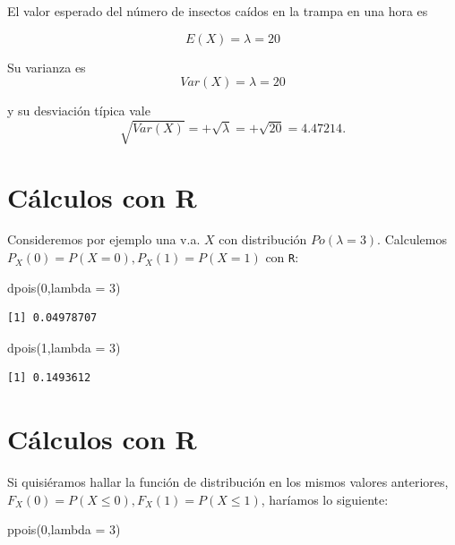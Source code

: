\documentclass[
  letterpaper,
  DIV=11,
  numbers=noendperiod]{scrreprt}
\newenvironment{Shaded}{\begin{snugshade}}{\end{snugshade}}
\newcommand{\AttributeTok}[1]{\textcolor[rgb]{0.40,0.45,0.13}{#1}}
\newcommand{\DecValTok}[1]{\textcolor[rgb]{0.68,0.00,0.00}{#1}}
\newcommand{\FunctionTok}[1]{\textcolor[rgb]{0.28,0.35,0.67}{#1}}
\newcommand{\NormalTok}[1]{\textcolor[rgb]{0.00,0.23,0.31}{#1}}
\begin{document}
El valor esperado del número de insectos caídos en la trampa en una hora
es

\[E(X)=\lambda=20\]

Su varianza es \[Var(X)=\lambda=20\]

y su desviación típica vale
\[\sqrt{Var(X)}=+\sqrt{\lambda}=+\sqrt{20}=4.47214.\]

\section{Cálculos con R}\label{cuxe1lculos-con-r-4}

Consideremos por ejemplo una v.a. \(X\) con distribución
\(Po(\lambda=3)\). Calculemos \(P_X(0)=P(X=0), P_X(1)=P(X=1)\) con
\texttt{R}:

\begin{Shaded}
\begin{Highlighting}[]
\FunctionTok{dpois}\NormalTok{(}\DecValTok{0}\NormalTok{,}\AttributeTok{lambda =} \DecValTok{3}\NormalTok{)}
\end{Highlighting}
\end{Shaded}

\begin{verbatim}
[1] 0.04978707
\end{verbatim}

\begin{Shaded}
\begin{Highlighting}[]
\FunctionTok{dpois}\NormalTok{(}\DecValTok{1}\NormalTok{,}\AttributeTok{lambda =} \DecValTok{3}\NormalTok{)}
\end{Highlighting}
\end{Shaded}

\begin{verbatim}
[1] 0.1493612
\end{verbatim}

\section{Cálculos con R}\label{cuxe1lculos-con-r-5}

Si quisiéramos hallar la función de distribución en los mismos valores
anteriores, \(F_X(0)=P(X\leq 0), F_X(1)=P(X\leq 1)\), haríamos lo
siguiente:

\begin{Shaded}
\begin{Highlighting}[]
\FunctionTok{ppois}\NormalTok{(}\DecValTok{0}\NormalTok{,}\AttributeTok{lambda =} \DecValTok{3}\NormalTok{)}
\end{Highlighting}
\end{Shaded}
\end{document}
